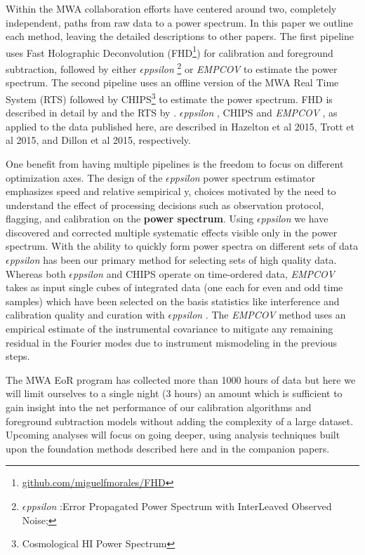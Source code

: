 \documentclass[preprint]{aastex}
\def\eppsilon{{\it $\epsilon$ppsilon }}
\def\empirical cov{\emph{EMPCOV }}
\def\chipscite{Trott et al 2015}
\def\eppsiloncite{Hazelton et al 2015}
\def\dilloncite{Dillon et al 2015}
\begin{document}
Within the MWA collaboration efforts have centered around two, completely independent, paths from raw data to a power spectrum.  In this paper we outline each method, leaving the detailed descriptions to other papers.   The first pipeline uses Fast Holographic Deconvolution (FHD\footnote{\url{github.com/miguelfmorales/FHD}}) for calibration and foreground subtraction, followed by either \eppsilon\footnote{\eppsilon:Error Propagated Power Spectrum with InterLeaved Observed Noise;} or \empirical cov to estimate the power spectrum.  The second pipeline uses an offline version of the MWA Real Time System (RTS) followed by CHIPS\footnote{Cosmological HI Power Spectrum} to estimate the power spectrum.  FHD is described in detail by \cite{Sullivan:2012p9457} and the RTS by \cite{Ord:2010p8442}. \eppsilon, CHIPS and \empirical cov, as applied to the data published here, are described in \eppsiloncite, \chipscite, and \dilloncite, respectively.

One benefit from having multiple pipelines is the freedom to focus on different optimization axes.  The design of the \eppsilon power spectrum estimator emphasizes speed and relative sempirical y, choices  motivated by the need to understand the effect of processing decisions such as observation protocol, flagging, and calibration on the {\bf power spectrum}. Using \eppsilon we have discovered and corrected multiple systematic effects visible only in the power spectrum. With the ability to quickly form power spectra on different sets of data \eppsilon has been our primary method for selecting sets of high quality data. Whereas both \eppsilon and CHIPS operate on time-ordered data, \empirical cov takes as input single cubes of integrated data (one each for even and odd time samples) which have been selected on the basis statistics like interference and calibration quality and curation with \eppsilon. The \empirical cov method uses an empirical estimate of the instrumental covariance to mitigate any remaining residual in the Fourier modes due to instrument mismodeling in the previous steps. 

 The MWA EoR program has collected more than 1000 hours of data but here we will limit ourselves to a single night (3 hours) an amount which is sufficient to gain insight into the net performance of our calibration algorithms and foreground subtraction models without adding the complexity of a large dataset.  Upcoming analyses will focus on going deeper, using analysis techniques built upon the foundation methods described here and in the companion papers.
\end{document}
